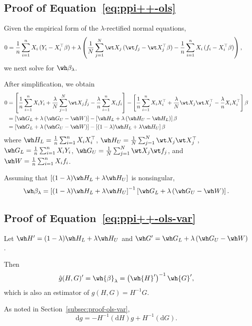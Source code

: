 \subsection{Proof of Equation~\eqref{eq:ppi++-ols}}
Given the empirical form of the $\lambda$-rectified normal equations,
\begin{align*}
0
&=
\frac{1}{n}\sum_{i=1}^n X_i\,(Y_i-X_i^\top\beta)+ \lambda\left(
\frac{1}{N}\sum_{j=1}^N \wt X_j\,(\wt f_j-\wt X_j^\top\beta)
-
\frac{1}{n}\sum_{i=1}^n X_i\,(f_i-X_i^\top\beta)
\right),
\end{align*}we next solve for $\wh\beta_\lambda$.

\noindent
After simplification, we obtain \begin{align*}
    0&=\left[\frac{1}{n}\sum^n_{i=1}X_iY_i
    +\frac{\lambda}{N}\sum^N_{j=1}\wt X_j\tilde{f}_j
    -\frac{\lambda}{n}\sum^n_{i=1}X_if_i\right]-
    \left[\frac{1}{n}\sum^n_{i=1}X_iX_i^\top
    +\frac{\lambda}{N}\wt X_j\wt X_j^\top
    -\frac{\lambda}{n}X_iX_i^\top \right]\beta\\
    &=\left[\wh G_L+\lambda\left(\wh G_U-\wh W\right) \right]-
    \left[\wh H_L+\lambda \left(\wh H_U-\wh H_L\right)\right]\beta\\
    &=\left[\wh G_L+\lambda\left(\wh G_U-\wh W\right) \right]-
    \left[(1-\lambda)\wh H_L+\lambda \wh H_U\right]\beta
\end{align*}where $\wh H_L=\frac{1}{n}\sum^n_{i=1} X_iX_i^\top$, 
$\wh H_U=\frac{1}{N}\sum^N_{j=1} \wt X_j \wt X_j^\top$, 
$\wh G_L=\frac{1}{n}\sum^n_{i=1} X_iY_i$, 
$\wh G_U=\frac{1}{N}\sum^N_{j=1} \wt X_j \wt f_j$, and $\wh W = \frac{1}{n}\sum^n_{i=1}X_if_i$.

\noindent
Assuming that $\left[(1-\lambda)\wh H_L+\lambda \wh H_U\right]$ is nonsingular, \[
\wh\beta_\lambda = \left[(1-\lambda)\wh H_L+\lambda \wh H_U\right]^{-1}\left[\wh G_L+\lambda\left(\wh G_U-\wh W\right) \right].
\]

\subsection{Proof of Equation~\eqref{eq:ppi++-ols-var}}

Let $\wh H^\prime = (1-\lambda)\wh H_L+\lambda \wh H_U$ and $\wh G^\prime = \wh G_L+\lambda \left(\wh G_U-\wh W\right)$. 

\noindent
Then \[
\hat{g}(H,G)'={\wh{\beta}}_\lambda =\left(\wh{H}^\prime\right)^{-1}\wh{G}^\prime,
\] which is also an estimator of $g(H,G)=H^{-1}G$.

\noindent
As noted in Section~\ref{subsec:proof-ols-var}, \[
\mathrm{d}g=-H^{-1}(\mathrm{d}H)g+H^{-1}\left(\mathrm{d}G\right).
\]

